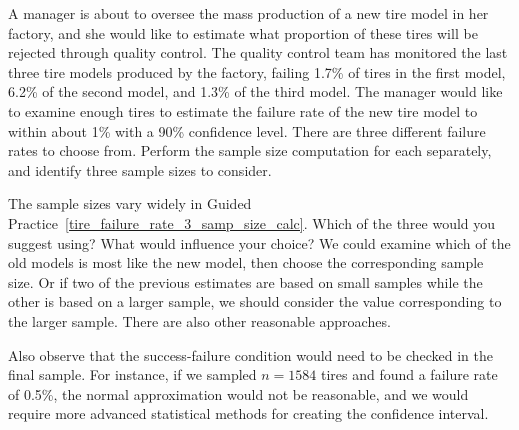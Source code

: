 \begin{exercisewrap}
\begin{nexercise}
\label{tire_failure_rate_3_samp_size_calc}%
A manager is about to oversee the mass
production of a new tire model in her factory,
and she would like to estimate what proportion of
these tires will be rejected through quality control.
The quality control team has monitored the last three
tire models produced by the factory,
failing 1.7\% of tires in the first model,
6.2\% of the second model,
and 1.3\% of the third model.
The manager would like to examine enough tires
to estimate the failure rate of the new tire model
to within about 1\% with a 90\% confidence level.
There are three different failure rates to choose from.
Perform the sample size computation for each separately,
and identify three sample sizes to consider.\footnotemark
\end{nexercise}
\end{exercisewrap}

\begin{examplewrap}
\begin{nexample}{The sample sizes vary widely in
    Guided Practice~\ref{tire_failure_rate_3_samp_size_calc}.
    Which of the three would you suggest using?
    What would influence your choice?}
  We could examine which of the old models is most
  like the new model, then choose the corresponding sample
  size.
  Or if two of the previous estimates are based on small
  samples while the other is based on a larger sample,
  we should consider the value corresponding to the larger
  sample.
  There are also other reasonable approaches.

  Also observe that the success-failure
  condition would need to be checked in the final sample.
  For instance, if we sampled $n = 1584$ tires and found
  a failure rate of 0.5\%, the normal approximation would
  not be reasonable, and we would require more advanced
  statistical methods for creating the confidence interval.
\end{nexample}
\end{examplewrap}

